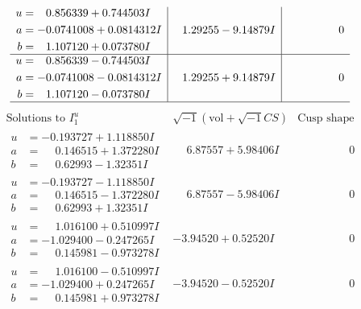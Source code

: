 \documentclass[1p]{elsarticle_modified}
\theoremstyle{definition}
\newcommand{\I}{\sqrt{-1}}
\begin{document}
$$\begin{array}{c|c|c}
\begin{aligned}
u &= \phantom{-}0.856339 + 0.744503 I \\
a &= -0.0741008 + 0.0814312 I \\
b &= \phantom{-}1.107120 + 0.073780 I\end{aligned}
 & \phantom{-}1.29255 - 9.14879 I & \phantom{-0.000000 } 0 \\ \hline\begin{aligned}
u &= \phantom{-}0.856339 - 0.744503 I \\
a &= -0.0741008 - 0.0814312 I \\
b &= \phantom{-}1.107120 - 0.073780 I\end{aligned}
 & \phantom{-}1.29255 + 9.14879 I & \phantom{-0.000000 } 0\\
 \hline 
 \end{array}$$\newpage$$\begin{array}{c|c|c}  
\text{Solutions to }I^u_{1}& \I (\text{vol} + \sqrt{-1}CS) & \text{Cusp shape}\\
 \hline 
\begin{aligned}
u &= -0.193727 + 1.118850 I \\
a &= \phantom{-}0.146515 + 1.372280 I \\
b &= \phantom{-}0.62993 - 1.32351 I\end{aligned}
 & \phantom{-}6.87557 + 5.98406 I & \phantom{-0.000000 } 0 \\ \hline\begin{aligned}
u &= -0.193727 - 1.118850 I \\
a &= \phantom{-}0.146515 - 1.372280 I \\
b &= \phantom{-}0.62993 + 1.32351 I\end{aligned}
 & \phantom{-}6.87557 - 5.98406 I & \phantom{-0.000000 } 0 \\ \hline\begin{aligned}
u &= \phantom{-}1.016100 + 0.510997 I \\
a &= -1.029400 - 0.247265 I \\
b &= \phantom{-}0.145981 - 0.973278 I\end{aligned}
 & -3.94520 + 0.52520 I & \phantom{-0.000000 } 0 \\ \hline\begin{aligned}
u &= \phantom{-}1.016100 - 0.510997 I \\
a &= -1.029400 + 0.247265 I \\
b &= \phantom{-}0.145981 + 0.973278 I\end{aligned}
 & -3.94520 - 0.52520 I & \phantom{-0.000000 } 0 \\ \hline\begin{aligned}

\end{aligned}
\end{array}$$
\end{document}
